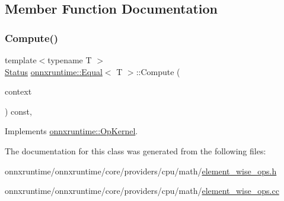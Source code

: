 \subsection{Member Function Documentation}
\mbox{\label{classonnxruntime_1_1Equal_ad3321c6389ed2a0928e95d75774ef5d3}} 
\subsubsection{\texorpdfstring{Compute()}{Compute()}}
{\footnotesize\ttfamily template$<$typename T $>$ \\
\mbox{\hyperlink{classonnxruntime_1_1common_1_1Status}{Status}} \mbox{\hyperlink{classonnxruntime_1_1Equal}{onnxruntime\+::\+Equal}}$<$ T $>$\+::Compute (\begin{DoxyParamCaption}\item[{\mbox{\hyperlink{classonnxruntime_1_1OpKernelContext}{Op\+Kernel\+Context}} $\ast$}]{context }\end{DoxyParamCaption}) const\hspace{0.3cm}{\ttfamily [override]}, {\ttfamily [virtual]}}



Implements \mbox{\hyperlink{classonnxruntime_1_1OpKernel_a9eca8656a78b1b3ab9d3351a12798650}{onnxruntime\+::\+Op\+Kernel}}.



The documentation for this class was generated from the following files\+:\begin{DoxyCompactItemize}
\item 
onnxruntime/onnxruntime/core/providers/cpu/math/\mbox{\hyperlink{element__wise__ops_8h}{element\+\_\+wise\+\_\+ops.\+h}}\item 
onnxruntime/onnxruntime/core/providers/cpu/math/\mbox{\hyperlink{element__wise__ops_8cc}{element\+\_\+wise\+\_\+ops.\+cc}}\end{DoxyCompactItemize}
